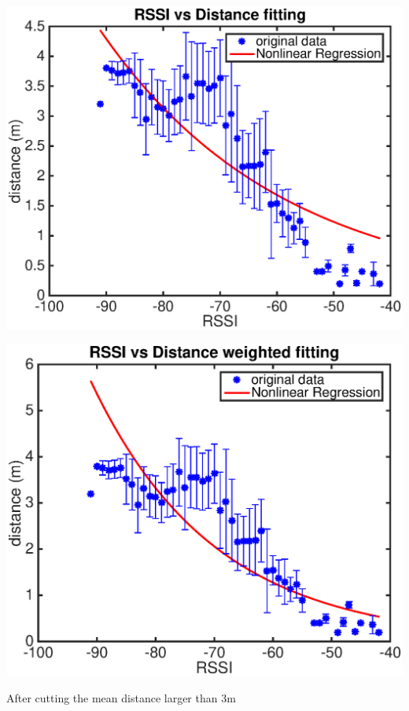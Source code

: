 \documentclass[11pt]{beamer}
\begin{document}
\begin{frame}
\includegraphics[width=\textwidth]{rssi_dis_fit_4dot4m.eps} 
\end{frame}

\begin{frame}
\includegraphics[width=\textwidth]{rssi_dis_fit_weighted_4dot4m.eps} 
\end{frame}

\begin{frame}
\centering
{\LARGE After cutting the mean distance larger than 3m}
\end{frame}
\end{document}
